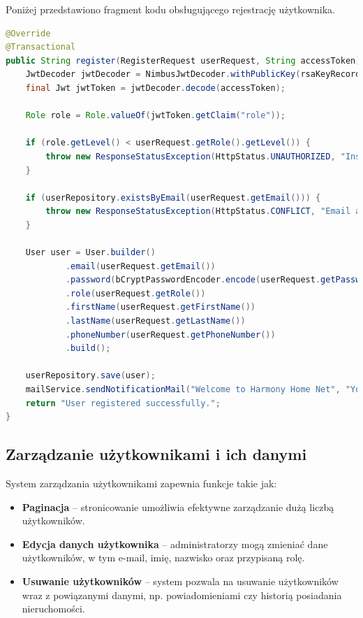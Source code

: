 \noindent Poniżej przedstawiono fragment kodu obsługującego rejestrację użytkownika.
\begin{lstlisting}[language=Java, style=JavaStyle, caption=Rejestracja użytkownika w \texttt{AuthServiceImp}]
@Override
@Transactional
public String register(RegisterRequest userRequest, String accessToken) {
    JwtDecoder jwtDecoder = NimbusJwtDecoder.withPublicKey(rsaKeyRecord.publicKey()).build();
    final Jwt jwtToken = jwtDecoder.decode(accessToken);

    Role role = Role.valueOf(jwtToken.getClaim("role"));

    if (role.getLevel() < userRequest.getRole().getLevel()) {
        throw new ResponseStatusException(HttpStatus.UNAUTHORIZED, "Insufficient permissions to update or assign the role");
    }

    if (userRepository.existsByEmail(userRequest.getEmail())) {
        throw new ResponseStatusException(HttpStatus.CONFLICT, "Email already exists");
    }

    User user = User.builder()
            .email(userRequest.getEmail())
            .password(bCryptPasswordEncoder.encode(userRequest.getPassword()))
            .role(userRequest.getRole())
            .firstName(userRequest.getFirstName())
            .lastName(userRequest.getLastName())
            .phoneNumber(userRequest.getPhoneNumber())
            .build();

    userRepository.save(user);
    mailService.sendNotificationMail("Welcome to Harmony Home Net", "Your account has been successfully created.", user.getEmail());
    return "User registered successfully.";
}
\end{lstlisting}

\subsection{Zarządzanie użytkownikami i ich danymi}

System zarządzania użytkownikami zapewnia funkcje takie jak:
\begin{itemize}
    \item \textbf{Paginacja} -- stronicowanie umożliwia efektywne zarządzanie dużą liczbą użytkowników.
    \item \textbf{Edycja danych użytkownika} -- administratorzy mogą zmieniać dane użytkowników, w tym e-mail, imię, nazwisko oraz przypisaną rolę.
    \item \textbf{Usuwanie użytkowników} -- system pozwala na usuwanie użytkowników wraz z powiązanymi danymi, np. powiadomieniami czy historią posiadania nieruchomości.
\end{itemize}

